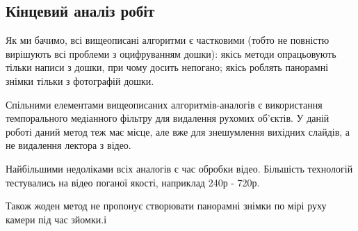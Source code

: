 \subsection{Кінцевий аналіз робіт}

Як ми бачимо, всі вищеописані алгоритми є частковими (тобто не повністю вирішують всі проблеми
з оцифруванням дошки): якісь методи опрацьовують тільки написи з дошки, 
при чому досить непогано; якісь роблять панорамні знімки тільки з фотографій дошки.

Спільними елементами вищеописаних алгоритмів-аналогів є використання 
темпорального медіанного фільтру для видалення рухомих об'єктів.
У даній роботі даний метод теж має місце, але вже для знешумлення
вихідних слайдів, а не видалення лектора з відео.

Найбільшими недоліками всіх аналогів є час обробки відео. Більшість технологій
тестувались на відео поганої якості, наприклад 240р - 720р. 

Також жоден метод не пропонує створювати панорамні знімки по мірі руху камери під
час зйомки.і 